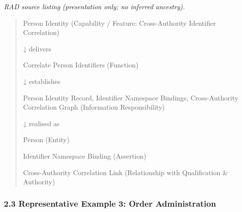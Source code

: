 \textit{RAD source listing (presentation only; no inferred ancestry).}
\begin{quote}
Person Identity (Capability / Feature: Cross-Authority Identifier Correlation)

↓ delivers

Correlate Person Identifiers (Function)

↓ establishes

Person Identity Record, Identifier Namespace Bindings, Cross-Authority Correlation Graph (Information Responsibility)

↓ realised as

Person (Entity)

Identifier Namespace Binding (Assertion)

Cross-Authority Correlation Link (Relationship with Qualification \& Authority)
\end{quote}
\label{rad:traceability:102}



\label{rad:traceability:104}
\subsubsection*{2.3 Representative Example 3: Order Administration}
\label{rad:traceability:106}

